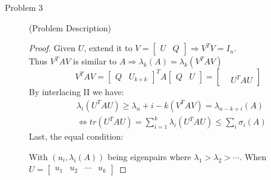 \documentclass{article}
\begin{document}
\begin{description}
	\item[Problem 3] (Problem Description)
	\begin{proof}
		Given $U$, extend it to $V = \begin{bmatrix}U & Q\end{bmatrix} \Rightarrow V^TV = I_n$. \\
		Thus $V^TAV$ is similar to $A \Rightarrow \lambda_k(A) = \lambda_k(V^TAV)$
		\begin{equation}
			V^TAV = \begin{bmatrix}Q & U_{k\times k}\end{bmatrix}^TA\begin{bmatrix}Q & U\end{bmatrix} = \begin{bmatrix} & \\ & U^TAU\end{bmatrix}
		\end{equation}
		By interlacing II we have:
		\begin{equation}\begin{aligned}
			& \lambda_i (U^TAU) \geq \lambda_n+i-k(V^TAV) = \lambda_{n-k+i}(A) \\
			& \Leftrightarrow tr(U^TAU) = \sum_{i = 1}^k \lambda_i(U^TAU) \leq \sum_{i}\sigma_{i}(A)
		\end{aligned}\end{equation}
		Last, the equal condition: 
		\par With $(u_i, \lambda_i(A))$ being eigenpairs where $\lambda_1 > \lambda_2 > \cdots$.
		When $U = \begin{bmatrix}u_1 & u_2 & \cdots & u_k\end{bmatrix}$


\end{proof}
\end{description}
\end{document}
